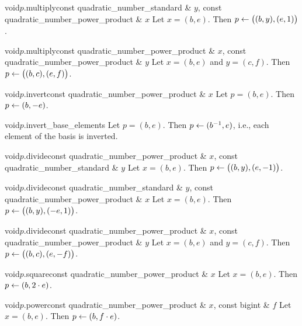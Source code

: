\begin{fcode}{void}{$p$.multiply}{const quadratic_number_standard & $y$,
    const quadratic_number_power_product & $x$}%
  Let $x = (b,e)$.  Then $p \leftarrow \bigl((b,y),(e,1)\bigr)$.
\end{fcode}

\begin{fcode}{void}{$p$.multiply}{const quadratic_number_power_product & $x$,
    const quadratic_number_power_product & $y$}%
  Let $x = (b,e)$ and $y = (c,f)$.  Then $p \leftarrow \bigl((b,c),(e,f)\bigr)$.
\end{fcode}

\begin{fcode}{void}{$p$.invert}{const quadratic_number_power_product & $x$}
  Let $p = (b,e)$.  Then $p \leftarrow (b,-e)$.
\end{fcode}

\begin{fcode}{void}{$p$.invert_base_elements}{}
  Let $p = (b,e)$.  Then $p \leftarrow (b^{-1},e)$, i.e., each element of the basis is inverted.
\end{fcode}

\begin{fcode}{void}{$p$.divide}{const quadratic_number_power_product & $x$,
    const quadratic_number_standard & $y$}%
  Let $x = (b,e)$.  Then $p \leftarrow \bigl((b,y),(e,-1)\bigr)$.
\end{fcode}

\begin{fcode}{void}{$p$.divide}{const quadratic_number_standard & $y$,
    const quadratic_number_power_product & $x$}%
  Let $x = (b,e)$.  Then $p \leftarrow \bigl((b,y),(-e,1)\bigr)$.
\end{fcode}

\begin{fcode}{void}{$p$.divide}{const quadratic_number_power_product & $x$,
    const quadratic_number_power_product & $y$}%
  Let $x = (b,e)$ and $y = (c,f)$.  Then $p \leftarrow \bigl((b,c),(e,-f)\bigr)$.
\end{fcode}

\begin{fcode}{void}{$p$.square}{const quadratic_number_power_product & $x$}
  Let $x = (b,e)$.  Then $p \leftarrow (b,2 \cdot e)$.
\end{fcode}

\begin{fcode}{void}{$p$.power}{const quadratic_number_power_product & $x$, const bigint & $f$}
  Let $x = (b,e)$.  Then $p \leftarrow (b,f \cdot e)$.
\end{fcode}


